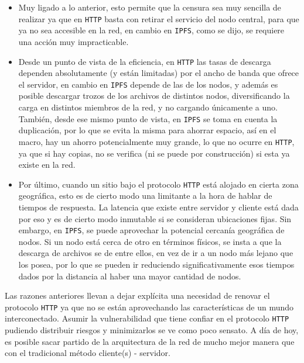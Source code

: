 \documentclass[letterpaper,10pt]{article}
\begin{document}
\begin{enumerate}
\begin{itemize}
\item Muy ligado a lo anterior, esto permite que la censura sea muy sencilla de realizar ya que en \texttt{HTTP} basta con retirar el servicio del nodo central, para que ya no sea accesible en la red, en cambio en \texttt{IPFS}, como se dijo, se requiere una acción muy impracticable.

\item Desde un punto de vista de la eficiencia, en \texttt{HTTP} las tasas de descarga dependen absolutamente (y están limitadas) por el ancho de banda que ofrece el servidor, en cambio en \texttt{IPFS} depende de las de los nodos, y además es posible descargar trozos de los archivos de distintos nodos, diversificando la carga en distintos miembros de la red, y no cargando únicamente a uno. También, desde ese mismo punto de vista, en \texttt{IPFS} se toma en cuenta la duplicación, por lo que se evita la misma para ahorrar espacio, así en el macro, hay un ahorro potencialmente muy grande, lo que no ocurre en \texttt{HTTP}, ya que si hay copias, no se verifica (ni se puede por construcción) si esta ya existe en la red.

\item Por último, cuando un sitio bajo el protocolo \texttt{HTTP} está alojado en cierta zona geográfica, esto es de cierto modo una limitante a la hora de hablar de tiempos de respuesta. La latencia que existe entre servidor y cliente está dada por eso y es de cierto modo inmutable si se consideran ubicaciones fijas. Sin embargo, en \texttt{IPFS}, se puede aprovechar la potencial cercanía geográfica de nodos. Si un nodo está cerca de otro en términos físicos, se insta a que la descarga de archivos se de entre ellos, en vez de ir a un nodo más lejano que los posea, por lo que se pueden ir reduciendo significativamente esos tiempos dados por la distancia al haber una mayor cantidad de nodos.

\end{itemize}

Las razones anteriores llevan a dejar explícita una necesidad de renovar el protocolo \texttt{HTTP} ya que no se están aprovechando las características de un mundo interconectado. Asumir la vulnerabilidad que tiene confiar en el protocolo \texttt{HTTP} pudiendo distribuir riesgos y minimizarlos se ve como poco sensato. A día de hoy, es posible sacar partido de la arquitectura de la red de mucho mejor manera que con el tradicional método cliente(s) - servidor.


\end{enumerate}
\end{document}
